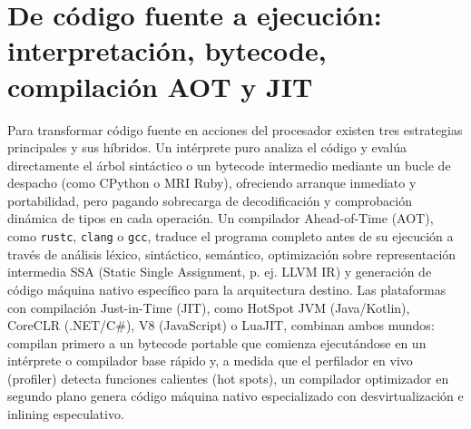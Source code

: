 \documentclass{book}
\begin{document}
\section{De código fuente a ejecución: interpretación, bytecode, compilación AOT y JIT}

Para transformar código fuente en acciones del procesador existen tres estrategias principales y sus híbridos. Un intérprete puro analiza el código y evalúa directamente el árbol sintáctico o un bytecode intermedio mediante un bucle de despacho (como CPython o MRI Ruby), ofreciendo arranque inmediato y portabilidad, pero pagando sobrecarga de decodificación y comprobación dinámica de tipos en cada operación. Un compilador Ahead-of-Time (AOT), como \texttt{rustc}, \texttt{clang} o \texttt{gcc}, traduce el programa completo antes de su ejecución a través de análisis léxico, sintáctico, semántico, optimización sobre representación intermedia SSA (Static Single Assignment, p. ej. LLVM IR) y generación de código máquina nativo específico para la arquitectura destino.
Las plataformas con compilación Just-in-Time (JIT), como HotSpot JVM (Java/Kotlin), CoreCLR (.NET/C\#), V8 (JavaScript) o LuaJIT, combinan ambos mundos: compilan primero a un bytecode portable que comienza ejecutándose en un intérprete o compilador base rápido y, a medida que el perfilador en vivo (profiler) detecta funciones calientes (hot spots), un compilador optimizador en segundo plano genera código máquina nativo especializado con desvirtualización e inlining especulativo.
\end{document}
